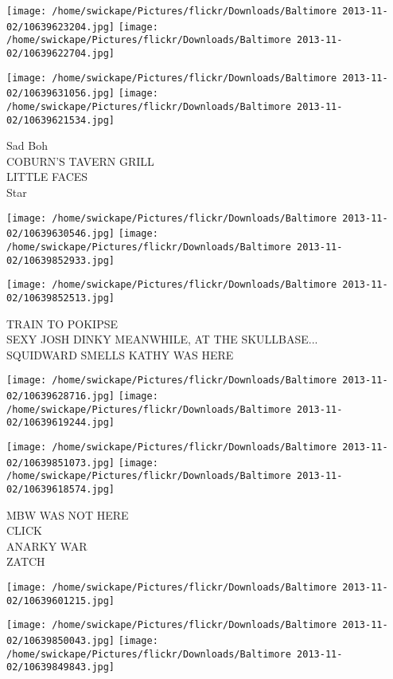 \documentclass[10pt,letterpaper]{article}
\begin{document}
\texttt{[image: /home/swickape/Pictures/flickr/Downloads/Baltimore 2013-11-02/10639623204.jpg]}
\texttt{[image: /home/swickape/Pictures/flickr/Downloads/Baltimore 2013-11-02/10639622704.jpg]}

\texttt{[image: /home/swickape/Pictures/flickr/Downloads/Baltimore 2013-11-02/10639631056.jpg]}
\texttt{[image: /home/swickape/Pictures/flickr/Downloads/Baltimore 2013-11-02/10639621534.jpg]}

Sad Boh\\
COBURN'S TAVERN GRILL\\
LITTLE FACES\\
Star
\pagebreak

\texttt{[image: /home/swickape/Pictures/flickr/Downloads/Baltimore 2013-11-02/10639630546.jpg]}
\texttt{[image: /home/swickape/Pictures/flickr/Downloads/Baltimore 2013-11-02/10639852933.jpg]}

\vspace{0.25in}
\texttt{[image: /home/swickape/Pictures/flickr/Downloads/Baltimore 2013-11-02/10639852513.jpg]}

TRAIN TO POKIPSE\\
SEXY JOSH DINKY MEANWHILE, AT THE SKULLBASE...\\
SQUIDWARD SMELLS KATHY WAS HERE
\pagebreak

\texttt{[image: /home/swickape/Pictures/flickr/Downloads/Baltimore 2013-11-02/10639628716.jpg]}
\texttt{[image: /home/swickape/Pictures/flickr/Downloads/Baltimore 2013-11-02/10639619244.jpg]}

\texttt{[image: /home/swickape/Pictures/flickr/Downloads/Baltimore 2013-11-02/10639851073.jpg]}
\texttt{[image: /home/swickape/Pictures/flickr/Downloads/Baltimore 2013-11-02/10639618574.jpg]}

MBW WAS NOT HERE\\
CLICK\\
ANARKY WAR\\
ZATCH
\pagebreak

\texttt{[image: /home/swickape/Pictures/flickr/Downloads/Baltimore 2013-11-02/10639601215.jpg]}

\vspace{0.25in}
\texttt{[image: /home/swickape/Pictures/flickr/Downloads/Baltimore 2013-11-02/10639850043.jpg]}
\texttt{[image: /home/swickape/Pictures/flickr/Downloads/Baltimore 2013-11-02/10639849843.jpg]}
\end{document}
